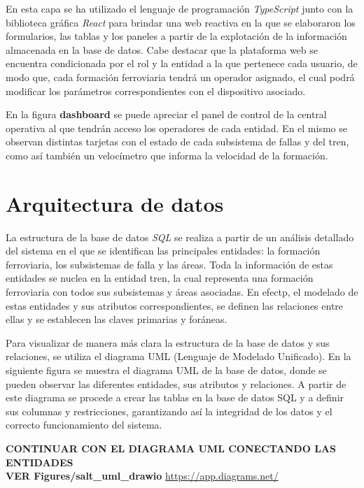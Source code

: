 En esta capa se ha utilizado el lenguaje de programación \textit{TypeScript} junto con la biblioteca gráfica \textit{React} para brindar una web reactiva en la que se elaboraron los formularios, las tablas y los paneles a partir de la explotación de la información almacenada en la base de datos. Cabe destacar que la plataforma web se encuentra condicionada por el rol y la entidad a la que pertenece cada usuario, de modo que, cada formación ferroviaria tendrá un operador asignado, el cual podrá modificar los parámetros correspondientes con el dispositivo asociado.

En la figura \textbf{dashboard} se puede apreciar el panel de control de la central operativa al que tendrán acceso los operadores de cada entidad.
En el mismo se observan distintas tarjetas con el estado de cada subsistema de fallas y del tren, como así también un velocímetro que informa la velocidad de la formación.


\newpage
\section{Arquitectura de datos}

La estructura de la base de datos \textit{SQL} se realiza a partir de un análisis detallado del sistema en el que se identifican las principales entidades: la formación ferroviaria, los subsistemas de falla y las áreas. Toda la información de estas entidades se nuclea en la entidad tren, la cual representa una formación ferroviaria con todos sus subsistemas y áreas asociadas. En efectp, el modelado de estas entidades y sus atributos correspondientes, se definen las relaciones entre ellas y se establecen las claves primarias y foráneas.

Para visualizar de manera más clara la estructura de la base de datos y sus relaciones, se utiliza el diagrama UML (Lenguaje de Modelado Unificado). En la siguiente figura se muestra el diagrama UML de la base de datos, donde se pueden observar las diferentes entidades, sus atributos y relaciones. A partir de este diagrama se procede a crear las tablas en la base de datos SQL y a definir sus columnas y restricciones, garantizando así la integridad de los datos y el correcto funcionamiento del sistema.


\textbf{CONTINUAR CON EL DIAGRAMA UML CONECTANDO LAS ENTIDADES  \\ VER Figures/salt\_uml\_drawio}
\url{https://app.diagrams.net/}


